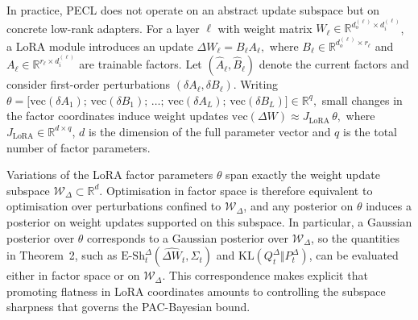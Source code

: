 \documentclass[10pt]{article} %
\begin{document}

In practice, PECL does not operate on an abstract update subspace but on concrete low-rank adapters.
For a layer $\ell$ with weight matrix $W_\ell \in \mathbb R^{d_o^{(\ell)} \times d_i^{(\ell)}}$, a LoRA module introduces an update
$
\Delta W_\ell = B_\ell A_\ell,
$
where $B_\ell \in \mathbb R^{d_o^{(\ell)} \times r_\ell}$ and $A_\ell \in \mathbb R^{r_\ell \times d_i^{(\ell)}}$ are trainable factors. Let $(\widehat{A}_\ell, \widehat{B}_\ell)$ denote the current factors and consider first-order perturbations $(\delta A_\ell, \delta B_\ell)$.
Writing
$
\theta
=
\big[
\mathrm{vec}(\delta A_1);\,
\mathrm{vec}(\delta B_1);\,
\dots;\,
\mathrm{vec}(\delta A_L);\,
\mathrm{vec}(\delta B_L)
\big]
\in \mathbb R^q,
$
small changes in the factor coordinates induce weight updates
$
\mathrm{vec}(\Delta W)
\approx
J_{\mathrm{LoRA}} \,\theta,
$
where $J_{\mathrm{LoRA}} \in \mathbb R^{d \times q}$, $d$ is the dimension of the full parameter vector and $q$ is the total number of factor parameters.


Variations of the LoRA factor parameters $\theta$ span exactly the weight update subspace $\mathcal W_\Delta \subset \mathbb R^d$. Optimisation in factor space is therefore equivalent to optimisation over perturbations confined to $\mathcal W_\Delta$, and any posterior on $\theta$ induces a posterior on weight updates supported on this subspace. In particular, a Gaussian posterior over $\theta$ corresponds to a Gaussian posterior over $\mathcal W_\Delta$, so the quantities in Theorem~2, such as $\mathrm{E\text{-}Sh}_t^{\Delta}(\hat{\Delta W}_t,\Sigma_t)$ and $\mathrm{KL}(Q^\Delta_t \Vert P^\Delta_t)$, can be evaluated either in factor space or on $\mathcal W_\Delta$. This correspondence makes explicit that promoting flatness in LoRA coordinates amounts to controlling the subspace sharpness that governs the PAC-Bayesian bound.
\end{document}
